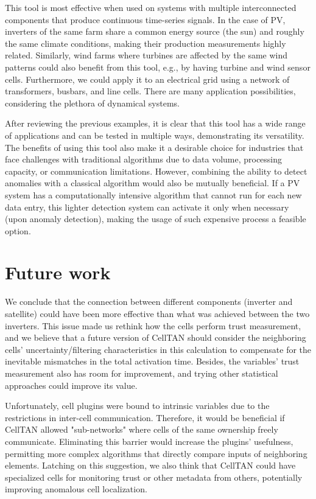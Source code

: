 This tool is most effective when used on systems with multiple interconnected components that produce continuous time-series signals. In the case of PV, inverters of the same farm share a common energy source (the sun) and roughly the same climate conditions, making their production measurements highly related. Similarly, wind farms where turbines are affected by the same wind patterns could also benefit from this tool, e.g., by having turbine and wind sensor cells. Furthermore, we could apply it to an electrical grid using a network of transformers, busbars, and line cells. There are many application possibilities, considering the plethora of dynamical systems.

After reviewing the previous examples, it is clear that this tool has a wide range of applications and can be tested in multiple ways, demonstrating its versatility. The benefits of using this tool also make it a desirable choice for industries that face challenges with traditional algorithms due to data volume, processing capacity, or communication limitations. However, combining the ability to detect anomalies with a classical algorithm would also be mutually beneficial. If a PV system has a computationally intensive algorithm that cannot run for each new data entry, this lighter detection system can activate it only when necessary (upon anomaly detection), making the usage of such expensive process a feasible option.

\section{Future work}

We conclude that the connection between different components (inverter and satellite) could have been more effective than what was achieved between the two inverters. This issue made us rethink how the cells perform trust measurement, and we believe that a future version of CellTAN should consider the neighboring cells' uncertainty/filtering characteristics in this calculation to compensate for the inevitable mismatches in the total activation time. Besides, the variables' trust measurement also has room for improvement, and trying other statistical approaches could improve its value.

Unfortunately, cell plugins were bound to intrinsic variables due to the restrictions in inter-cell communication. Therefore, it would be beneficial if CellTAN allowed "sub-networks" where cells of the same ownership freely communicate. Eliminating this barrier would increase the plugins' usefulness, permitting more complex algorithms that directly compare inputs of neighboring elements. Latching on this suggestion, we also think that CellTAN could have specialized cells for monitoring trust or other metadata from others, potentially improving anomalous cell localization.

